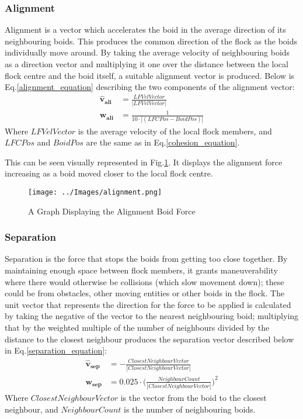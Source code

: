 \subsubsection{Alignment}
Alignment is a vector which accelerates the boid in the average direction of its neighbouring boids. This produces the common direction of the flock as the boids individually move around. By taking the average velocity of neighbouring boids as a direction vector and multiplying it one over the distance between the local flock centre and the boid itself, a suitable alignment vector is produced. Below is Eq.\ref{alignment_equation} describing the two components of the alignment vector:
\begin{equation}
\begin{split}
	\boldsymbol{\hat{v}_{ali}} &= \frac{ LFVelVector} {|LFVelVector|} \\
	\boldsymbol{w_{ali}} &= \frac{1} {10 \cdot |(LFCPos - BoidPos)|}
\end{split}
\label{alignment_equation}
\end{equation}
Where $LFVelVector$ is the average velocity of the local flock members, and $LFCPos$ and $BoidPos$ are the same as in Eq.\ref{cohesion_equation}.

This can be seen visually represented in Fig.\ref{fig:alignment}. It displays the alignment force increasing as a boid moved closer to the local flock centre.
\begin{figure}
	\texttt{[image: ../Images/alignment.png]}
	\caption{A Graph Displaying the Alignment Boid Force}
	\label{fig:alignment}
\end{figure}

\subsubsection{Separation}
Separation is the force that stops the boids from getting too close together. By maintaining enough space between flock members, it grants maneuverability where there would otherwise be collisions (which slow movement down); these could be from obstacles, other moving entities or other boids in the flock. The unit vector that represents the direction for the force to be applied is calculated by taking the negative of the vector to the nearest neighbouring boid; multiplying that by the weighted multiple of the number of neighbours divided by the distance to the closest neighbour produces the separation vector described below in Eq.\ref{separation_equation}:
\begin{equation}
\begin{split}
	\boldsymbol{\hat{v}_{sep}} &= -\frac{ClosestNeighbourVector} {| ClosestNeighbourVector|} \\
	\boldsymbol{w_{sep}} &= 0.025 \cdot  \Big(\frac{NeighbourCount} {|ClosestNeighbourVector|}\Big)^2
\end{split}
\label{separation_equation}
\end{equation}
Where $ClosestNeighbourVector$ is the vector from the boid to the closest neighbour, and $NeighbourCount$ is the number of neighbouring boids.

